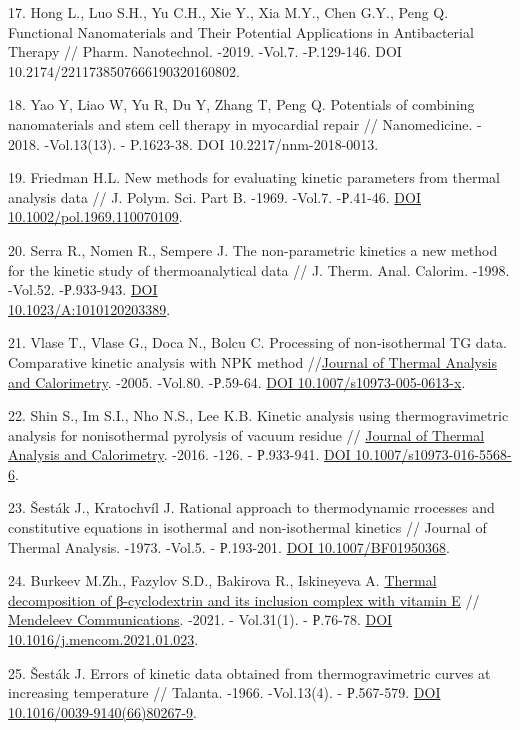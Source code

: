 \begin{refs}
17. Hong L., Luo S.H., Yu C.H., Xie Y., Xia M.Y., Chen G.Y., Peng Q.
Functional Nanomaterials and Their Potential Applications in
Antibacterial Therapy // Pharm. Nanotechnol. -2019. -Vol.7. -P.129-146.
DOI 10.2174/2211738507666190320160802.~

18. Yao Y, Liao W, Yu R, Du Y, Zhang T, Peng Q. Potentials of combining
nanomaterials and stem cell therapy in myocardial repair //
Nanomedicine. - 2018. -Vol.13(13). - P.1623-38.
DOI 10.2217/nnm-2018-0013.

19. Friedman H.L. New methods for evaluating kinetic parameters from
thermal analysis data // J. Polym. Sci. Part B. -1969. -Vol.7. -Р.41-46.
\href{https://doi.org/10.1002/pol.1969.110070109}{DOI
10.1002/pol.1969.110070109}.

20. Serra R., Nomen R., Sempere J. The non-parametric kinetics a new
method for the kinetic study of thermoanalytical data // J. Therm. Anal.
Calorim. -1998. -Vol.52. -Р.933-943.
\href{https://doi.org/10.1023/A:1010120203389}{DOI\\
10.1023/A:1010120203389}.

21. Vlase T., Vlase G., Doca N., Bolcu C. Processing of non-isothermal
TG data. Comparative kinetic analysis with NPK method
//\href{https://link.springer.com/journal/10973}{Journal of Thermal
Analysis and Calorimetry}. -2005. -Vol.80. -Р.59-64.
\href{https://doi.org/10.1007/s10973-005-0613-x}{DOI
10.1007/s10973-005-0613-x}.

22. Shin S., Im S.I., Nho N.S., Lee K.B. Kinetic analysis using
thermogravimetric analysis for nonisother\-mal pyrolysis of vacuum residue
// \href{https://link.springer.com/journal/10973}{Journal of Thermal
Analysis and Calorimetry}. -2016. -126. - Р.933-941.
\href{https://doi.org/10.1007/s10973-016-5568-6}{DOI
10.1007/s10973-016-5568-6}.

23. Šesták J., Kratochvíl J. Rational approach to thermodynamic
rrocesses and constitutive equations in isothermal and non-isothermal
kinetics // Journal of Thermal Analysis. -1973. -Vol.5. - Р.193-201.
\href{https://doi.org/10.1007/BF01950368}{DOI 10.1007/BF01950368}.

24. Burkeev M.Zh., Fazylov S.D., Bakirova R., Iskineyeva A.
\href{https://www.sciencedirect.com/science/article/pii/S0959943621000237}{Thermal
decomposition of β-cyclodextrin and its inclusion complex with vitamin
E} //
\href{https://www.sciencedirect.com/science/journal/09599436}{Mendeleev
Communications}. -2021. - Vol.31(1). - Р.76-78.
\href{https://doi.org/10.1016/j.mencom.2021.01.023}{DOI
10.1016/j.mencom.2021.01.023}.

25. Šesták J. Errors of kinetic data obtained from thermogravimetric
curves at increasing temperature // Talanta. -1966. -Vol.13(4).
- Р.567-579. \href{https://doi.org/10.1016/0039-9140(66)80267-9}{DOI
10.1016/0039-9140(66)80267-9}.
\end{refs}

